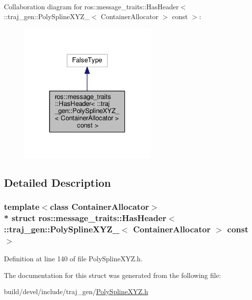 Collaboration diagram for ros\+:\+:message\+\_\+traits\+:\+:Has\+Header$<$ \+:\+:traj\+\_\+gen\+:\+:Poly\+Spline\+X\+Y\+Z\+\_\+$<$ Container\+Allocator $>$ const $>$\+:
\nopagebreak
\begin{figure}[H]
\begin{center}
\leavevmode
\includegraphics[width=195pt]{structros_1_1message__traits_1_1_has_header_3_01_1_1traj__gen_1_1_poly_spline_x_y_z___3_01_conta74a58fc55c4df1a71a08f6315e8e361f}
\end{center}
\end{figure}


\subsection{Detailed Description}
\subsubsection*{template$<$class Container\+Allocator$>$\\*
struct ros\+::message\+\_\+traits\+::\+Has\+Header$<$ \+::traj\+\_\+gen\+::\+Poly\+Spline\+X\+Y\+Z\+\_\+$<$ Container\+Allocator $>$ const  $>$}



Definition at line 140 of file Poly\+Spline\+X\+Y\+Z.\+h.



The documentation for this struct was generated from the following file\+:\begin{DoxyCompactItemize}
\item 
build/devel/include/traj\+\_\+gen/\hyperlink{_poly_spline_x_y_z_8h}{Poly\+Spline\+X\+Y\+Z.\+h}\end{DoxyCompactItemize}
